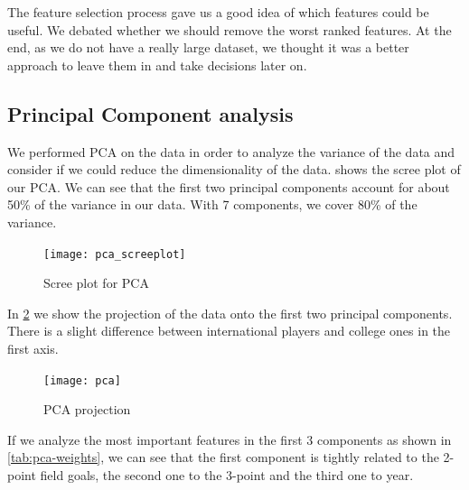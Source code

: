 The feature selection process gave us a good idea of which features could be useful. We debated whether we should remove the worst ranked features. At the end, as we do not have a really large dataset, we thought it was a better approach to leave them in and take decisions later on.

\subsection{Principal Component analysis}%
\label{sub:pca}

We performed PCA on the data in order to analyze the variance of the data and
consider if we could reduce the dimensionality of the data. 
shows the scree plot of our PCA. We can see that the first two principal
components account for about 50\% of the variance in our data. With 7
components, we cover 80\% of the variance.

\begin{figure}[H]
  \texttt{[image: pca\_screeplot]}
  \caption{Scree plot for PCA}%
  \label{fig:pca-scree}
\end{figure}

In \cref{fig:pca} we show the projection of the data onto the first two principal
components. There is a slight difference between international players and college ones
in the first axis.

\begin{figure}[H]
  \texttt{[image: pca]}
  \caption{PCA projection}%
  \label{fig:pca}
\end{figure}

If we analyze the most important features in the first 3 components as shown in
\cref{tab:pca-weights}, we can see that the first component is tightly related
to the 2-point field goals, the second one to the 3-point and the third one to
year.

